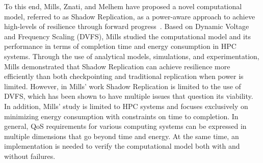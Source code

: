 To this end, Mills, Znati, and Melhem have proposed a novel computational model, referred to as Shadow Replication, as a  
power-aware approach to achieve high-levels of resilience through forward progress~\cite{mills_2014_icnc,mills_2014_pdp,mills2014power}. Based on Dynamic Voltage and Frequency Scaling (DVFS), Mills studied the computational model and its performance in terms of completion time and energy consumption in HPC systems. Through the use of analytical models, simulations, and experimentation, Mills demonstrated that Shadow Replication can achieve resilience more efficiently than both checkpointing and traditional replication when power is limited. However, in Mills' work Shadow Replication is limited to the use of DVFS, which has been shown to have multiple issues that question its viability. In addition, Mills' study is limited to HPC systems and focuses exclusively on minimizing energy consumption with constraints on time to completion. In general, QoS requirements for various computing systems can be expressed in multiple dimensions that go beyond time and energy. At the same time, an implementation is needed to verify the computational model both with and without failures. 



